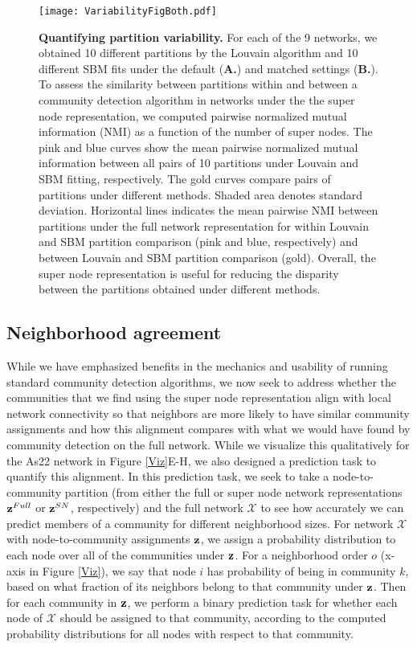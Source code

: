 \begin{figure}
\begin{center}
\centering
\texttt{[image: VariabilityFigBoth.pdf]}
\caption{{\bf Quantifying partition variability.} For each of the 9 networks, we obtained 10 different partitions by the Louvain algorithm and 10 different SBM fits under the default ({\bf A.}) and matched settings ({\bf B.}). To assess the similarity between partitions within and between a community detection algorithm in networks under the the super node representation, we computed pairwise normalized mutual information (NMI) as a function of the number of super nodes. The pink and blue curves show the mean pairwise normalized mutual information between all pairs of 10 partitions under Louvain and SBM fitting, respectively. The gold curves compare pairs of partitions under different methods. Shaded area denotes standard deviation. Horizontal lines indicates the mean pairwise NMI between partitions under the full network representation for within Louvain and SBM partition comparison (pink and blue, respectively) and between Louvain and SBM partition comparison (gold). Overall, the super node representation is useful for reducing the disparity between the partitions obtained under different methods.}
\label{VAR}
\end{center}
\end{figure}

\subsection{Neighborhood agreement}
While we have emphasized benefits in the mechanics and usability of running standard community detection algorithms, we now seek to address whether the communities that we find using the super node representation align with local network connectivity so that neighbors are more likely to have similar community assignments and how this alignment compares with what we would have found by community detection on the full network. While we visualize this qualitatively for the As22 network in Figure \ref{Viz}E-H, we also designed a prediction task to quantify this alignment. In this prediction task, we seek to take a node-to-community partition (from either the full or super node network representations ${\bf z}^{Full}$ or ${\bf z}^{SN}$, respectively) and the full network ${\mathcal X}$ to see how accurately we can predict members of a community for different neighborhood sizes.
For network ${\mathcal X}$ with node-to-community assignments ${\bf z}$, we assign a probability distribution to each node over all of the communities under ${\bf z}$. For a neighborhood order $o$ (x-axis in Figure \ref{Viz}), we say that node $i$ has probability of being in community $k$, based on what fraction of its neighbors belong to that community under ${\bf z}$. Then for each community in ${\bf z}$, we perform a binary prediction task for whether each node of ${\mathcal X}$ should be assigned to that community, according to the computed probability distributions for all nodes with respect to that community. 

